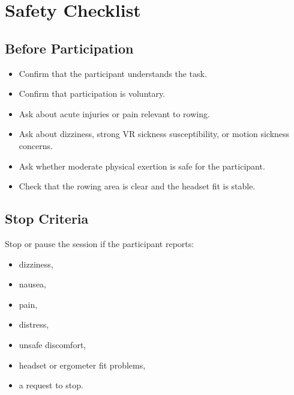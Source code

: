 \section{Safety Checklist}
\label{app:study_materials_safety_checklist}

\subsection*{Before Participation}

\begin{itemize}
    \item Confirm that the participant understands the task.
    \item Confirm that participation is voluntary.
    \item Ask about acute injuries or pain relevant to rowing.
    \item Ask about dizziness, strong VR sickness susceptibility, or motion sickness concerns.
    \item Ask whether moderate physical exertion is safe for the participant.
    \item Check that the rowing area is clear and the headset fit is stable.
\end{itemize}

\subsection*{Stop Criteria}

Stop or pause the session if the participant reports:

\begin{itemize}
    \item dizziness,
    \item nausea,
    \item pain,
    \item distress,
    \item unsafe discomfort,
    \item headset or ergometer fit problems,
    \item a request to stop.
\end{itemize}

